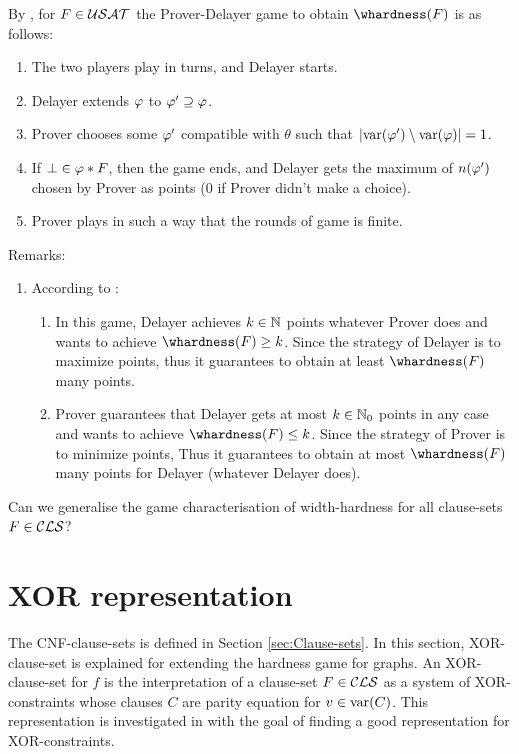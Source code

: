 \documentclass{report}
\begin{document}
\begin{lem}\label{lem:whdgame}
By \cite{BeyersdorffKullmann2014PHP}, for $F \in \mathcal{USAT}$ the Prover-Delayer game to obtain $\whardness(F)$ is as follows:

  \begin{enumerate}
  \item The two players play in turns, and Delayer starts.
  \item Delayer extends $\varphi$ to $\varphi' \supseteq \varphi$.
  \item Prover chooses some $\varphi'$ compatible with $\theta$ such that $\lvert \operatorname{var}(\varphi') \setminus \operatorname{var}(\varphi) \rvert = 1$.
  \item If $\bot \in \varphi * F$, then the game ends, and Delayer gets the maximum of $n(\varphi')$ chosen by Prover as points ($0$ if Prover didn't make a choice).
  \item Prover plays in such a way that the rounds of game is finite.
  \end{enumerate}
  \end{lem}
Remarks:
  \begin{enumerate}
  \item According to \cite{BeyersdorffKullmann2014PHP}:
  \begin{enumerate}
  \item In this game, Delayer achieves $k \in \mathbb{N}$ points whatever Prover does and wants to achieve $\whardness(F) \ge k$. Since the strategy of Delayer is to maximize points, thus it guarantees to obtain at least $\whardness(F)$ many points.
  \item Prover guarantees that Delayer gets at most $k \in \mathbb{N}_0$ points in any case and wants to achieve $\whardness(F) \le k$. Since the strategy of Prover is to minimize points, Thus it guarantees to obtain at most $\whardness(F)$ many points for Delayer (whatever Delayer does).
  \end{enumerate}
  \end{enumerate}

\begin{quest}\label{que:whdall}
Can we generalise the game characterisation of width-hardness for all clause-sets  $F \in \mathcal{CLS}$?
\end{quest}
\section{XOR representation}
\label{sec:XOR representation}

The CNF-clause-sets is defined in Section \ref{sec:Clause-sets}. In this section, XOR-clause-set is explained for extending the hardness game for graphs. An XOR-clause-set for $f$ is the interpretation of a clause-set $F \in \mathcal{CLS}$ as a system of XOR-constraints whose clauses $C$ are parity equation for $v \in \operatorname{var}(C)$. This representation is investigated in \cite{GwynneKullmann2013GoodRepresentations,GwynneKullmann2013GoodRepresentationsIIex,GwynneKullmann2013GoodRepresentationsIILata} with the goal of finding a good representation for XOR-constraints.
\end{document}
